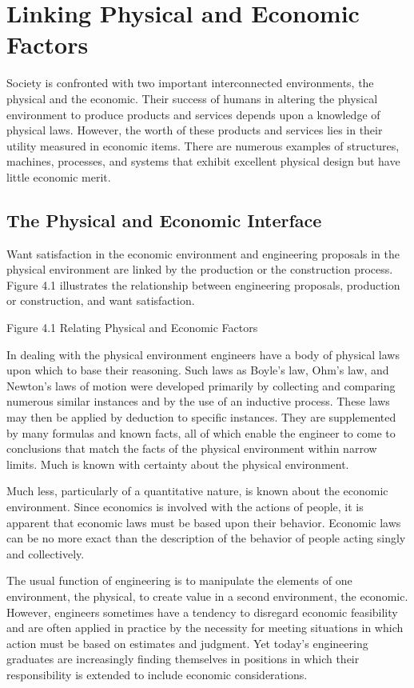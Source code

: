 \section{Linking Physical and Economic Factors}

Society is confronted with two important interconnected environments, the physical and the economic. Their success of humans in altering the physical environment to produce products and services depends upon a knowledge of physical laws. However, the worth of these products and services lies in their utility measured in economic items. There are numerous examples of structures, machines, processes, and systems that exhibit excellent physical design but have little economic merit.

\subsection{The Physical and Economic Interface}

Want satisfaction in the economic environment and engineering proposals in the physical environment are linked by the production or the construction process. Figure 4.1 illustrates the relationship between engineering proposals, production or construction, and want satisfaction.

Figure 4.1 Relating Physical and Economic Factors

In dealing with the physical environment engineers have a body of physical laws upon which to base their reasoning. Such laws as Boyle’s law, Ohm’s law, and Newton’s laws of motion were developed primarily by collecting and comparing numerous similar instances and by the use of an inductive process. These laws may then be applied by deduction to specific instances. They are supplemented by many formulas and known facts, all of which enable the engineer to come to conclusions that match the facts of the physical environment within narrow limits. Much is known with certainty about the physical environment.

Much less, particularly of a quantitative nature, is known about the economic environment. Since economics is involved with the actions of people, it is apparent that economic laws must be based upon their behavior. Economic laws can be no more exact than the description of the behavior of people acting singly and collectively.

The usual function of engineering is to manipulate the elements of one environment, the physical, to create value in a second environment, the economic. However, engineers sometimes have a tendency to disregard economic feasibility and are often applied in practice by the necessity for meeting situations in which action must be based on estimates and judgment. Yet today’s engineering graduates are increasingly finding themselves in positions in which their responsibility is extended to include economic considerations.


